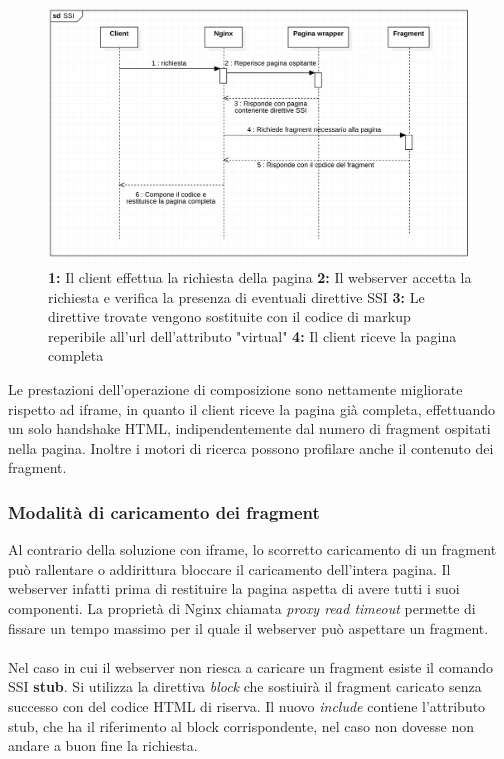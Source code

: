 \begin{figure}[H]
    \centering
    \includegraphics[width=140mm]{img/SSI sequence}
    \caption{ 
    \textbf{1:} Il client effettua la richiesta della pagina
    \textbf{2:} Il webserver accetta la richiesta e verifica la presenza di eventuali direttive SSI
    \textbf{3:} Le direttive trovate vengono sostituite con il codice di markup reperibile all'url dell'attributo "virtual"
    \textbf{4:} Il client riceve la pagina completa
    }
  \end{figure}
Le prestazioni dell'operazione di composizione sono nettamente migliorate rispetto ad iframe, 
in quanto il client riceve la pagina già completa, effettuando un solo handshake HTML, indipendentemente dal numero
di fragment ospitati nella pagina. Inoltre i motori di ricerca possono profilare anche il contenuto dei fragment.

\subsubsection{Modalità di caricamento dei fragment}
Al contrario della soluzione con iframe, lo scorretto caricamento di un fragment può rallentare o addirittura bloccare 
il caricamento dell'intera pagina. Il webserver infatti prima di restituire la pagina aspetta di avere tutti  i suoi componenti.
La proprietà di Nginx chiamata \emph{proxy read timeout} permette di fissare un tempo massimo per il quale il webserver 
può aspettare un fragment.
\\\\
Nel caso in cui il webserver non riesca a caricare un fragment esiste il comando SSI \textbf{stub}.
Si utilizza la direttiva \emph{block} che sostiuirà il fragment caricato senza successo con del codice HTML di riserva.
Il nuovo \emph{include} contiene l'attributo stub, che ha il riferimento al block corrispondente, nel caso non dovesse non andare
a buon fine la richiesta.
\\

